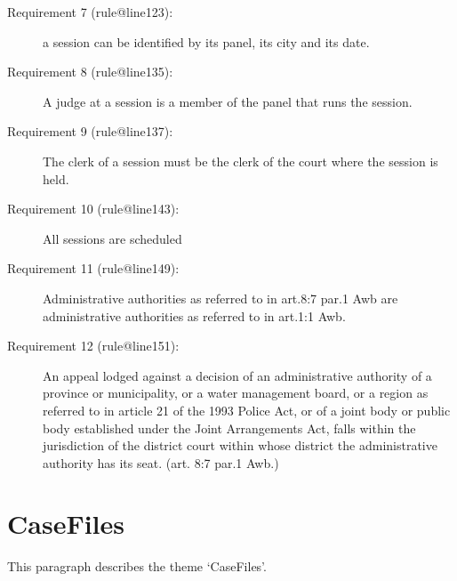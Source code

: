 \documentclass[10pt,a4paper]{report}              %
\theoremstyle{plain}\theorembodyfont{\rmfamily}\newtheorem{definition}{Definition}[section]
\theoremstyle{plain}\theorembodyfont{\rmfamily}\newtheorem{designrule}[definition]{Requirement}
\begin{document}
\begin{description}
\item[Requirement 7 (rule@line123):]
\label{ReqRule:rule@line123}
a session can be identified by its panel, its city and its date.

\end{description}
\begin{description}
\item[Requirement 8 (rule@line135):]
\label{ReqRule:rule@line135}
A judge at a session is a member of the panel that runs the session.

\end{description}
\begin{description}
\item[Requirement 9 (rule@line137):]
\label{ReqRule:rule@line137}
The clerk of a session must be the clerk of the court where the session
is held.

\end{description}
\begin{description}
\item[Requirement 10 (rule@line143):]
\label{ReqRule:rule@line143}
All sessions are scheduled

\end{description}
\begin{description}
\item[Requirement 11 (rule@line149):]
\label{ReqRule:rule@line149}
Administrative authorities as referred to in art.8:7 par.1 Awb are
administrative authorities as referred to in art.1:1 Awb.

\end{description}
\begin{description}
\item[Requirement 12 (rule@line151):]
\label{ReqRule:rule@line151}
An appeal lodged against a decision of an administrative authority of a
province or municipality, or a water management board, or a region as
referred to in article 21 of the 1993 Police Act, or of a joint body or
public body established under the Joint Arrangements Act, falls within
the jurisdiction of the district court within whose district the
administrative authority has its seat. (art. 8:7 par.1 Awb.)

\end{description}
\section{CaseFiles}

This paragraph describes the theme `CaseFiles'.
\end{document}
